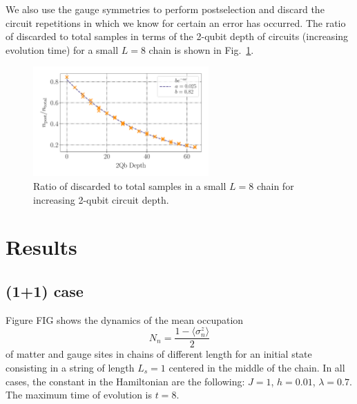 \documentclass[a4paper]{article}
\begin{document}
We also use the gauge symmetries to perform postselection and discard the circuit repetitions in which we know for certain an error has occurred. The ratio of discarded to total samples in terms of the 2-qubit depth of circuits (increasing evolution time) for a small $L=8$ chain is shown in Fig.~\ref{fig:postselection_samples}.

\begin{figure}
    \centering
    \hspace{-1cm}
    \includegraphics[width=0.6\textwidth]{postselected_samples.pdf}
    \caption{Ratio of discarded to total samples in a small $L=8$ chain for increasing 2-qubit circuit depth.}
    \label{fig:postselection_samples}
\end{figure}

\section{Results}

\subsection{(1+1) case}

Figure FIG shows the dynamics of the mean occupation
%
\begin{equation}
    N_n = \frac{1 - \langle \sigma_n^z \rangle}{2}
\end{equation}
%
of matter and gauge sites in chains of different length for an initial state consisting in a string of length $L_s = 1$ centered in the middle of the chain. In all cases, the constant in the Hamiltonian are the following: $J = 1$, $h = 0.01$, $\lambda = 0.7$. The maximum time of evolution is $t = 8$.
\end{document}
